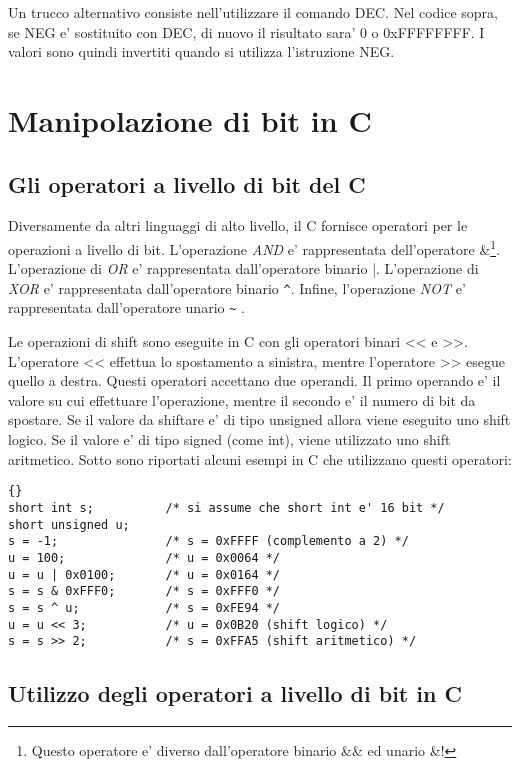 Un trucco alternativo consiste nell'utilizzare il comando {\code DEC}. Nel
codice sopra, se {\code NEG} e' sostituito con {\code DEC}, di nuovo il 
risultato sara' 0 o 0xFFFFFFFF. I valori sono quindi invertiti quando si
utilizza l'istruzione {\code NEG}. 


\section{Manipolazione di bit in C}

\subsection{Gli operatori a livello di bit del C}

Diversamente da altri linguaggi di alto livello, il C fornisce operatori
per le operazioni a livello di bit. L'operazione \emph{AND} e' 
rappresentata dell'operatore {\code \&}\footnote{Questo operatore e' 
diverso dall'operatore binario {\code \&\&} ed unario {\code \&}!}.
L'operazione di \emph{OR} e' rappresentata dall'operatore binario {\code |}.
L'operazione di \emph{XOR} e' rappresentata dall'operatore
binario {\code \verb|^|}. Infine, l'operazione \emph{NOT} e' 
rappresentata dall'operatore unario {\code \verb|~| }.

Le operazioni di shift sono eseguite in C con gli operatori binari
{\code <<} e {\code >>}. L'operatore {\code <<} effettua lo spostamento 
a sinistra, mentre l'operatore {\code >>} esegue quello a destra. 
Questi operatori accettano due operandi. Il primo operando e' il valore su
cui effettuare l'operazione, mentre il secondo e' il numero di bit da 
spostare. Se il valore da shiftare e' di tipo unsigned allora viene
eseguito uno shift logico. Se il valore e' di tipo signed (come {\code int}),
viene utilizzato uno shift aritmetico. Sotto sono riportati alcuni esempi
in C che utilizzano questi operatori:
\begin{lstlisting}{}
short int s;          /* si assume che short int e' 16 bit */
short unsigned u;
s = -1;               /* s = 0xFFFF (complemento a 2) */
u = 100;              /* u = 0x0064 */
u = u | 0x0100;       /* u = 0x0164 */
s = s & 0xFFF0;       /* s = 0xFFF0 */
s = s ^ u;            /* s = 0xFE94 */
u = u << 3;           /* u = 0x0B20 (shift logico) */
s = s >> 2;           /* s = 0xFFA5 (shift aritmetico) */
\end{lstlisting}

\subsection{Utilizzo degli operatori a livello di bit in C}

